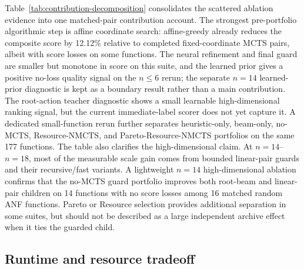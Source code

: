 \documentclass[11pt]{article}
\begin{document}
\begin{table}[t]
\centering
\small
\caption{High-dimensional root-action teacher diagnostic on 10 $n=14$ functions
with available linear-pair actions.  Oracle rows score wider root-action sets by
building actual greedy child plans.  Negative mean score change favors the
target.}
\label{tab:root-action-oracle}

\end{table}

Table~\ref{tab:contribution-decomposition} consolidates the scattered
ablation evidence into one matched-pair contribution account.  The strongest
pre-portfolio algorithmic step is affine coordinate search: affine-greedy
already reduces the composite score by 12.12\% relative to completed
fixed-coordinate MCTS pairs, albeit with score losses on some functions.  The
neural refinement and final guard are smaller but monotone in score on this
suite, and the learned prior gives a positive no-loss quality signal on the
$n\leq 6$ rerun; the separate $n=14$ learned-prior diagnostic is kept as a
boundary result rather than a main contribution.  The root-action teacher
diagnostic shows a small learnable high-dimensional ranking signal, but the
current immediate-label scorer does not yet capture it.  A dedicated
small-function rerun further separates
heuristic-only, beam-only, no-MCTS, Resource-NMCTS, and Pareto-Resource-NMCTS
portfolios on the same 177 functions.  The table also clarifies the
high-dimensional claim.  At $n=14$--$n=18$, most of the measurable scale gain
comes from bounded linear-pair guards and their recursive/fast variants.  A
lightweight $n=14$ high-dimensional ablation confirms that the no-MCTS guard
portfolio improves both root-beam and linear-pair children on 14 functions
with no score losses among 16 matched random ANF functions.  Pareto or
Resource selection provides additional separation in some suites, but should
not be described as a large independent archive effect when it ties the
guarded child.

\begin{table}[t]
\centering
\scriptsize
\caption{Contribution decomposition from matched function-level comparisons.
Wins/losses/ties use the composite resource score.  Negative mean score change
favors the component in the first column.}
\label{tab:contribution-decomposition}

\end{table}

\subsection{Runtime and resource tradeoff}
\end{document}
